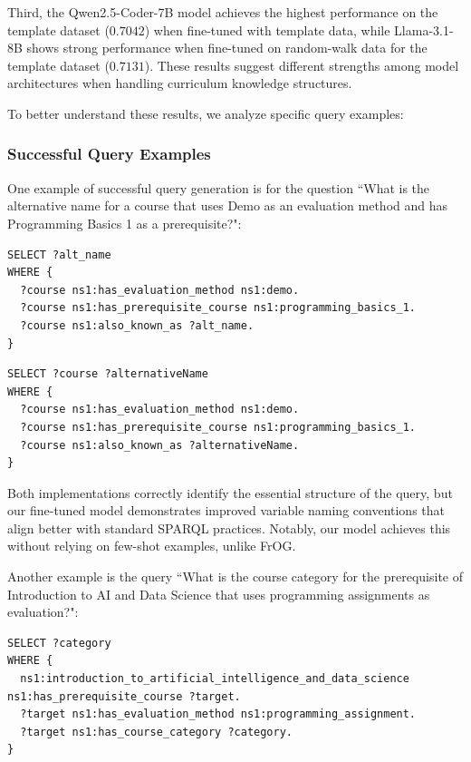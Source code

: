 Third, the Qwen2.5-Coder-7B model achieves the highest performance on the template dataset ($0.7042$) when fine-tuned with template data, while Llama-3.1-8B shows strong performance when fine-tuned on random-walk data for the template dataset ($0.7131$). These results suggest different strengths among model architectures when handling curriculum knowledge structures.

To better understand these results, we analyze specific query examples:

\subsubsection{Successful Query Examples}
One example of successful query generation is for the question ``What is the alternative name for a course that uses Demo as an evaluation method and has Programming Basics 1 as a prerequisite?":

\begin{lstlisting}[language=SPARQL, caption=Our Template Fine-tuned Model Output for Alternative Course Name, label=code:curriculum-alt-finetuned]
SELECT ?alt_name
WHERE {
  ?course ns1:has_evaluation_method ns1:demo.
  ?course ns1:has_prerequisite_course ns1:programming_basics_1.
  ?course ns1:also_known_as ?alt_name.
}
\end{lstlisting}

\begin{lstlisting}[language=SPARQL, caption=FrOG Output for Alternative Course Name, label=code:curriculum-alt-previous]
SELECT ?course ?alternativeName
WHERE {
  ?course ns1:has_evaluation_method ns1:demo.
  ?course ns1:has_prerequisite_course ns1:programming_basics_1.
  ?course ns1:also_known_as ?alternativeName.
}
\end{lstlisting}

Both implementations correctly identify the essential structure of the query, but our fine-tuned model demonstrates improved variable naming conventions that align better with standard SPARQL practices. Notably, our model achieves this without relying on few-shot examples, unlike FrOG.

Another example is the query ``What is the course category for the prerequisite of Introduction to AI and Data Science that uses programming assignments as evaluation?":

\begin{lstlisting}[language=SPARQL, caption=Our Random-Walk Fine-tuned Model Output for Course Category, label=code:curriculum-category-finetuned]
SELECT ?category
WHERE {
  ns1:introduction_to_artificial_intelligence_and_data_science ns1:has_prerequisite_course ?target.
  ?target ns1:has_evaluation_method ns1:programming_assignment.
  ?target ns1:has_course_category ?category.
}
\end{lstlisting}

